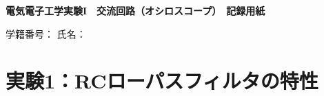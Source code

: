 
\begin{center}
  {\sffamily\gtfamily\bfseries\Large 電気電子工学実験I　交流回路（オシロスコープ）　記録用紙}
\end{center}

\vspace{0.6\baselineskip}
\begin{flushright}
  学籍番号：\underline{\hspace{12\zw}}\quad
  氏名：\underline{\hspace{12\zw}}
\end{flushright}
\vspace{0.8\baselineskip}

\section*{実験1：RCローパスフィルタの特性}


